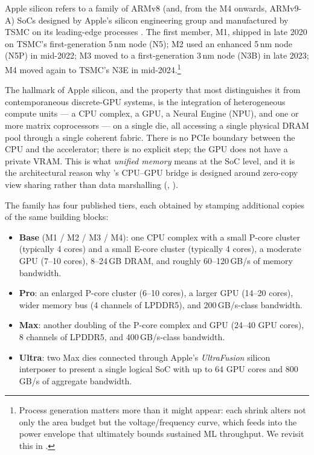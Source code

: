 Apple silicon refers to a family of ARMv8 (and, from the M4 onwards,
ARMv9-A) SoCs designed by Apple's silicon engineering group and
manufactured by TSMC on its leading-edge processes
\cite{apple_m1_2020,apple_m4_2024}. The first member,
M1, shipped in late 2020 on TSMC's first-generation 5\,nm node (N5);
M2 used an enhanced 5\,nm node (N5P) in mid-2022; M3 moved to a
first-generation 3\,nm node (N3B) in late 2023; M4 moved again to
TSMC's N3E in mid-2024.\footnote{Process generation matters more than
it might appear: each shrink alters not only the area budget but the
voltage/frequency curve, which feeds into the power envelope that
ultimately bounds sustained ML throughput. We revisit this in
.}

The hallmark of Apple silicon, and the property that most distinguishes
it from contemporaneous discrete-GPU systems, is the integration of
heterogeneous compute units --- a CPU complex, a GPU, a Neural Engine
(NPU), and one or more matrix coprocessors --- on a single die, all
accessing a single physical DRAM pool through a single coherent fabric.
There is no PCIe boundary between the CPU and the accelerator; there is
no explicit  step; the GPU does not have a private
VRAM. This is what \emph{unified memory} means at the SoC level, and it
is the architectural reason why \Lucid's CPU--GPU bridge is designed
around zero-copy view sharing rather than data marshalling
(, ).

The family has four published tiers, each obtained by stamping
additional copies of the same building blocks:
\begin{itemize}
  \item \textbf{Base} (M1 / M2 / M3 / M4): one CPU complex with a small
    P-core cluster (typically 4 cores) and a small E-core cluster
    (typically 4 cores), a moderate GPU (7--10 cores), 8--24\,GB DRAM,
    and roughly 60--120\,GB/s of memory bandwidth.
  \item \textbf{Pro}: an enlarged P-core cluster (6--10 cores), a
    larger GPU (14--20 cores), wider memory bus (4 channels of
    LPDDR5), and 200\,GB/s-class bandwidth.
  \item \textbf{Max}: another doubling of the P-core complex and GPU
    (24--40 GPU cores), 8 channels of LPDDR5, and 400\,GB/s-class
    bandwidth.
  \item \textbf{Ultra}: two Max dies connected through Apple's
    \emph{UltraFusion} silicon interposer to present a single logical
    SoC with up to 64 GPU cores and 800\,GB/s of aggregate bandwidth.
\end{itemize}

